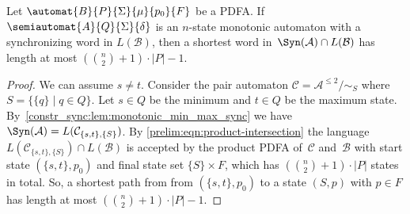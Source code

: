 \begin{proposition}
	\label{constr_sync:prop:monotonic_bound}
	Let $\automat{B}{P}{\Sigma}{\mu}{p_0}{F}$ be a PDFA. %
	If $\semiautomat{A}{Q}{\Sigma}{\delta}$
	is an $n$-state monotonic automaton with a synchronizing word in $L(\mathcal B)$,
	then a shortest word in~$\Syn(\mathcal A) \cap L(\mathcal B)$
	has length at most $\left( \binom{n}{2} + 1 \right) \cdot |P| - 1$.
\end{proposition}
\begin{proof} 
	We can assume $s \ne t$. Consider the pair automaton $\mathcal C = \mathcal A^{\le 2} / {\sim_S}$
	where $S = \{ \{q\} \mid q \in Q \}$.
	Let $s \in Q$ be the minimum and $t \in Q$
	be the maximum state.
	By~\cref{constr_sync:lem:monotonic_min_max_sync} 
	we have $\Syn(\mathcal A) = L(\mathcal C_{\{s,t\}, \{S\}})$.
	By \cref{prelim:eqn:product-intersection} 
	the language $L(\mathcal C_{\{s,t\}, \{S\}}) \cap L(\mathcal B)$
	is accepted by the product PDFA
	of~$\mathcal C$ and~$\mathcal B$
	with start state $(\{s,t\}, p_0)$ and final state set $\{S\}\times F$,
	which has 
	$\left(\binom{n}{2} + 1 \right) \cdot |P|$ states in total.
	So, a shortest path from from $(\{s,t\}, p_0)$
	to a state $(S, p)$ with $p \in F$
	has length at most $\left(\binom{n}{2} + 1 \right) \cdot |P| - 1$.	
\end{proof} 

